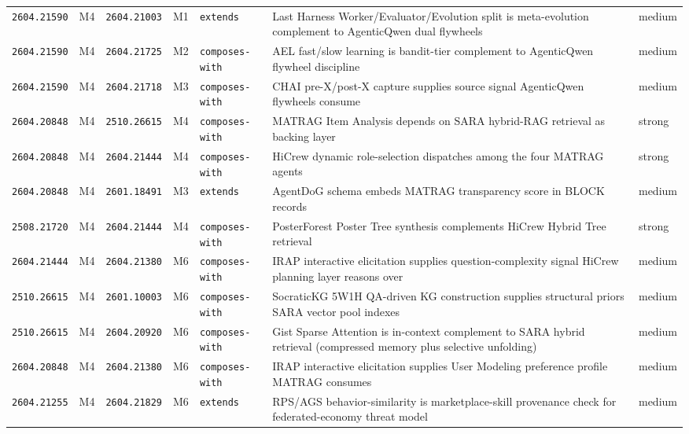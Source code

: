\documentclass[11pt,letterpaper]{article}
\newcommand{\arxivid}[1]{\texttt{\textcolor{accent}{#1}}}
\begin{document}
\begin{footnotesize}
\begin{longtable}{@{}L{0.09\textwidth} L{0.03\textwidth} L{0.09\textwidth} L{0.03\textwidth} L{0.13\textwidth} L{0.40\textwidth} L{0.06\textwidth}@{}}
\arxivid{2604.21590} & M4 & \arxivid{2604.21003} & M1 & \texttt{\small extends} & Last Harness Worker/Evaluator/Evolution split is meta-evolution complement to AgenticQwen dual flywheels & medium \\
\arxivid{2604.21590} & M4 & \arxivid{2604.21725} & M2 & \texttt{\small composes-with} & AEL fast/slow learning is bandit-tier complement to AgenticQwen flywheel discipline & medium \\
\arxivid{2604.21590} & M4 & \arxivid{2604.21718} & M3 & \texttt{\small composes-with} & CHAI pre-X/post-X capture supplies source signal AgenticQwen flywheels consume & medium \\
\arxivid{2604.20848} & M4 & \arxivid{2510.26615} & M4 & \texttt{\small composes-with} & MATRAG Item Analysis depends on SARA hybrid-RAG retrieval as backing layer & strong \\
\arxivid{2604.20848} & M4 & \arxivid{2604.21444} & M4 & \texttt{\small composes-with} & HiCrew dynamic role-selection dispatches among the four MATRAG agents & strong \\
\arxivid{2604.20848} & M4 & \arxivid{2601.18491} & M3 & \texttt{\small extends} & AgentDoG schema embeds MATRAG transparency score in BLOCK records & medium \\
\arxivid{2508.21720} & M4 & \arxivid{2604.21444} & M4 & \texttt{\small composes-with} & PosterForest Poster Tree synthesis complements HiCrew Hybrid Tree retrieval & strong \\
\arxivid{2604.21444} & M4 & \arxivid{2604.21380} & M6 & \texttt{\small composes-with} & IRAP interactive elicitation supplies question-complexity signal HiCrew planning layer reasons over & medium \\
\arxivid{2510.26615} & M4 & \arxivid{2601.10003} & M6 & \texttt{\small composes-with} & SocraticKG 5W1H QA-driven KG construction supplies structural priors SARA vector pool indexes & medium \\
\arxivid{2510.26615} & M4 & \arxivid{2604.20920} & M6 & \texttt{\small composes-with} & Gist Sparse Attention is in-context complement to SARA hybrid retrieval (compressed memory plus selective unfolding) & medium \\
\arxivid{2604.20848} & M4 & \arxivid{2604.21380} & M6 & \texttt{\small composes-with} & IRAP interactive elicitation supplies User Modeling preference profile MATRAG consumes & medium \\
\arxivid{2604.21255} & M4 & \arxivid{2604.21829} & M6 & \texttt{\small extends} & RPS/AGS behavior-similarity is marketplace-skill provenance check for federated-economy threat model & medium \\

\end{longtable}
\end{footnotesize}
\end{document}
